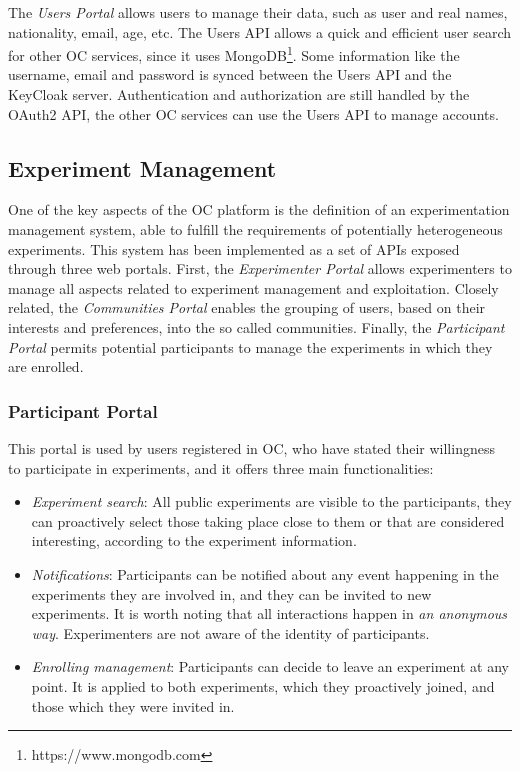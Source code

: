 The \emph{Users Portal} allows users to manage their data, such as user and real names, nationality, email, age, etc. The Users API allows a quick and efficient user search for other OC services, since it uses MongoDB\footnote{https://www.mongodb.com}. Some information like the username, email and password is synced between the Users API and the KeyCloak server. Authentication and authorization are still handled by the OAuth2 API, the other OC services can use the Users API to manage accounts.

\subsection{Experiment Management}

One of the key aspects of the OC platform is the definition of an experimentation management system, able to fulfill the requirements of potentially heterogeneous experiments. This system has been implemented as a set of APIs exposed through three web portals. First, the \textit{Experimenter Portal} allows experimenters to manage all aspects related to experiment management and exploitation. Closely related, the \textit{Communities Portal} enables the grouping of users, based on their interests and preferences, into the so called communities. Finally, the \textit{Participant Portal} permits potential participants to manage the experiments in which they are enrolled. 

\subsubsection{Participant Portal}

This portal is used by users registered in OC, who have stated their willingness to participate in experiments, and it offers three main functionalities:

\begin{itemize}
	\item\emph{Experiment search}: All public experiments are visible to the participants, they can proactively select those taking place close to them or that are considered interesting, according to the experiment information.
	\item\emph{Notifications}: Participants can be notified about any event happening in the experiments they are involved in, and they can be invited to new experiments. It is worth noting that all interactions happen in \textit{an anonymous way}. Experimenters are not aware of the identity of participants.
	\item\emph{Enrolling management}: Participants can decide to leave an experiment at any point. It is applied to both experiments, which they proactively joined, and those which they were invited in.
\end{itemize}

